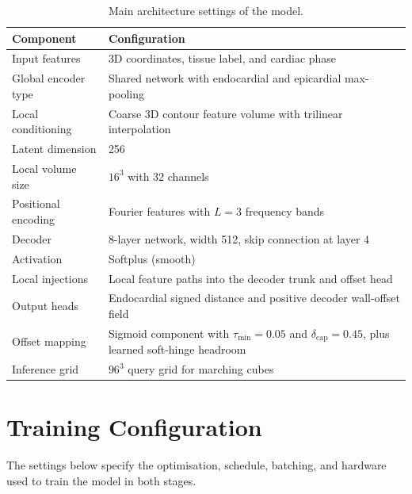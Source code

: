 \begin{table}[H]
	\centering
	\caption[Model architecture settings]{Main architecture settings of the
	model.}
	\label{tab:model-hyperparameters}
	\thesistablestyle
	\begin{tabular*}{\textwidth}{@{\extracolsep{\fill}}p{} p{}@{}}
		\toprule
		Component & Configuration \\
		\midrule
		Input features & 3D coordinates, tissue label, and cardiac phase \\
		Global encoder type & Shared network with endocardial and epicardial max-pooling \\
		Local conditioning & Coarse 3D contour feature volume with trilinear interpolation \\
		Latent dimension & 256 \\
		Local volume size & $16^3$ with 32 channels \\
		Positional encoding & Fourier features with $L=3$ frequency bands \\
		Decoder & 8-layer network, width 512, skip connection at layer 4 \\
		Activation & Softplus (smooth) \\
		Local injections & Local feature paths into the decoder trunk and offset head \\
		Output heads & Endocardial signed distance and positive decoder wall-offset field \\
		Offset mapping & Sigmoid component with $\tau_{\min}=0.05$ and $\delta_{\mathrm{cap}}=0.45$, plus learned soft-hinge headroom \\
		Inference grid & $96^3$ query grid for marching cubes \\
		\bottomrule
	\end{tabular*}
\end{table}

\clearpage
\section{Training Configuration}
\label{sec:appendix-training-configuration}
\noindent
The settings below specify the optimisation, schedule, batching, and hardware
used to train the model in both stages.

